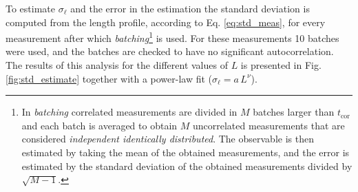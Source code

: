 To estimate $\sigma_\ell$ and the error in the estimation the standard deviation is computed from the length profile, according to Eq. \eqref{eq:std_meas}, for every measurement after which \emph{batching}\footnote{In \emph{batching} correlated measurements are divided in $M$ batches larger than $t_\text{cor}$ and each batch is averaged to obtain $M$ uncorrelated measurements that are considered \emph{independent identically distributed}.
    The observable is then estimated by taking the mean of the obtained measurements, and the error is estimated by the standard deviation of the obtained measurements divided by $\sqrt{M - 1}.$
} is used. For these measurements 10 batches were used, and the batches are checked to have no significant autocorrelation.
The results of this analysis for the different values of $L$ is presented in Fig. \ref{fig:std_estimate} together with a power-law fit ($\sigma_\ell = a \, L^{\nu}$).
